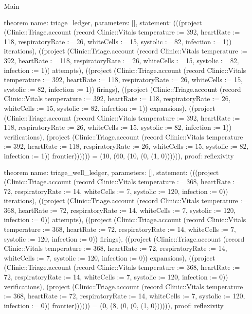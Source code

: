 \begin{lexlean}{Main}
\begin{semanticmodule}
theorem{
  name: triage_ledger,
  parameters: [],
  statement: (((project (Clinic::Triage.account (record Clinic::Vitals {temperature := 392, heartRate := 118, respiratoryRate := 26, whiteCells := 15, systolic := 82, infection := 1})) iterations), ((project (Clinic::Triage.account (record Clinic::Vitals {temperature := 392, heartRate := 118, respiratoryRate := 26, whiteCells := 15, systolic := 82, infection := 1})) attempts), ((project (Clinic::Triage.account (record Clinic::Vitals {temperature := 392, heartRate := 118, respiratoryRate := 26, whiteCells := 15, systolic := 82, infection := 1})) firings), ((project (Clinic::Triage.account (record Clinic::Vitals {temperature := 392, heartRate := 118, respiratoryRate := 26, whiteCells := 15, systolic := 82, infection := 1})) expansions), ((project (Clinic::Triage.account (record Clinic::Vitals {temperature := 392, heartRate := 118, respiratoryRate := 26, whiteCells := 15, systolic := 82, infection := 1})) verifications), (project (Clinic::Triage.account (record Clinic::Vitals {temperature := 392, heartRate := 118, respiratoryRate := 26, whiteCells := 15, systolic := 82, infection := 1})) frontier)))))) = (10, (60, (10, (0, (1, 0)))))),
  proof: reflexivity{}
}

theorem{
  name: triage_well_ledger,
  parameters: [],
  statement: (((project (Clinic::Triage.account (record Clinic::Vitals {temperature := 368, heartRate := 72, respiratoryRate := 14, whiteCells := 7, systolic := 120, infection := 0})) iterations), ((project (Clinic::Triage.account (record Clinic::Vitals {temperature := 368, heartRate := 72, respiratoryRate := 14, whiteCells := 7, systolic := 120, infection := 0})) attempts), ((project (Clinic::Triage.account (record Clinic::Vitals {temperature := 368, heartRate := 72, respiratoryRate := 14, whiteCells := 7, systolic := 120, infection := 0})) firings), ((project (Clinic::Triage.account (record Clinic::Vitals {temperature := 368, heartRate := 72, respiratoryRate := 14, whiteCells := 7, systolic := 120, infection := 0})) expansions), ((project (Clinic::Triage.account (record Clinic::Vitals {temperature := 368, heartRate := 72, respiratoryRate := 14, whiteCells := 7, systolic := 120, infection := 0})) verifications), (project (Clinic::Triage.account (record Clinic::Vitals {temperature := 368, heartRate := 72, respiratoryRate := 14, whiteCells := 7, systolic := 120, infection := 0})) frontier)))))) = (0, (8, (0, (0, (1, 0)))))),
  proof: reflexivity{}
}


\end{semanticmodule}
\end{lexlean}
